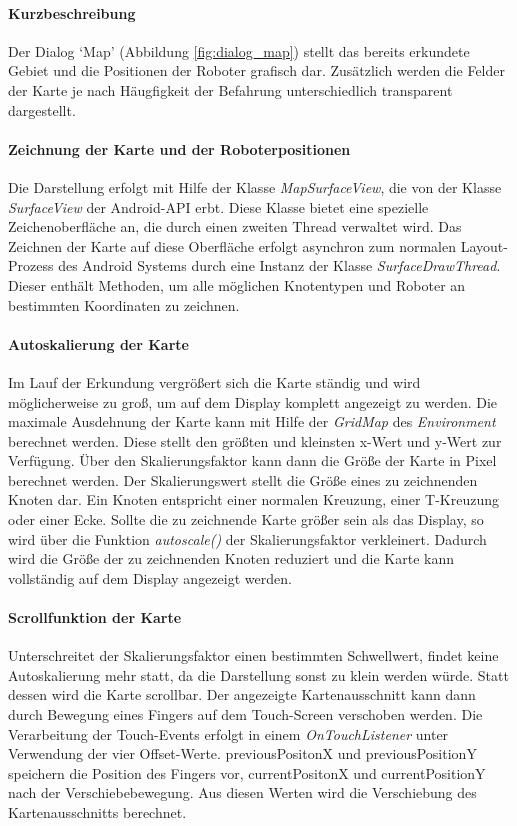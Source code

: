 \documentclass[10pt,a4paper]{article}
\begin{document}
	\paragraph*{Kurzbeschreibung} Der Dialog `Map' (Abbildung \ref{fig:dialog_map}) stellt das bereits erkundete Gebiet und die Positionen der
	Roboter grafisch dar. Zusätzlich werden die Felder der Karte je nach Häugfigkeit der Befahrung unterschiedlich transparent dargestellt.
	
	\paragraph*{Zeichnung der Karte und der Roboterpositionen}
	Die Darstellung erfolgt mit Hilfe der Klasse \textit{MapSurfaceView}, die von der Klasse \textit{SurfaceView} der Android-API erbt. Diese Klasse
	bietet eine spezielle Zeichenoberfläche an, die durch einen zweiten Thread verwaltet wird. Das Zeichnen der Karte auf diese Oberfläche erfolgt
	asynchron zum normalen Layout-Prozess des Android Systems durch eine Instanz der Klasse \textit{SurfaceDrawThread}.
	Dieser enthält Methoden, um alle möglichen Knotentypen und Roboter an bestimmten Koordinaten zu zeichnen.
	
	\paragraph*{Autoskalierung der Karte}
	Im Lauf der Erkundung vergrößert sich die Karte ständig und wird möglicherweise zu groß, um auf dem Display komplett angezeigt zu werden.
    Die maximale Ausdehnung der Karte kann mit Hilfe der \textit{GridMap} des \textit{Environment} berechnet werden. Diese stellt den größten und
    kleinsten x-Wert und y-Wert zur Verfügung. Über den Skalierungsfaktor kann dann die Größe der Karte in Pixel berechnet werden. Der
    Skalierungswert stellt die Größe eines zu zeichnenden Knoten dar. Ein Knoten entspricht einer normalen Kreuzung, einer T-Kreuzung oder
    einer Ecke.
	Sollte die zu zeichnende Karte größer sein als das Display, so wird über die Funktion \textit{autoscale()} der Skalierungsfaktor verkleinert.
	Dadurch wird die Größe der zu zeichnenden Knoten reduziert und die Karte kann vollständig auf dem Display angezeigt werden. 
	
	\paragraph*{Scrollfunktion der Karte}
	Unterschreitet der Skalierungsfaktor einen bestimmten Schwellwert, findet keine Autoskalierung mehr statt, da die Darstellung sonst zu klein
	werden würde. Statt dessen wird die Karte scrollbar. Der angezeigte Kartenausschnitt kann dann durch Bewegung eines Fingers auf dem Touch-Screen
	verschoben werden.
	Die Verarbeitung der Touch-Events erfolgt in einem \textit{OnTouchListener} unter Verwendung der vier Offset-Werte. previousPositonX und
	previousPositionY speichern die Position des Fingers vor, currentPositonX und currentPositionY nach der Verschiebebewegung. Aus diesen Werten
	wird die Verschiebung des Kartenausschnitts berechnet.
	
\end{document}
